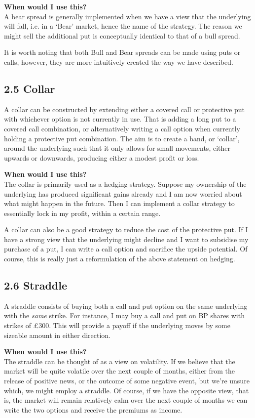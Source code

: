 \documentclass[11pt]{article}
\begin{document}
\textbf{When would I use this?} \\ 
A bear spread is generally implemented when we have a view that the underlying will fall, i.e. in a `Bear' market, hence the name of the strategy. The reason we might sell the additional put is conceptually identical to that of a bull spread. 

It is worth noting that both Bull and Bear spreads can be made using puts or calls, however, they are more intuitively created the way we have described.

\subsection*{2.5 Collar}
A collar can be constructed by extending either a covered call or protective put with whichever option is not currently in use. That is adding a long put to a covered call combination, or alternatively writing a call option when currently holding a protective put combination. The aim is to create a band, or `collar', around the underlying such that it only allows for small movements, either upwards or downwards, producing either a modest profit or loss.

\textbf{When would I use this?} \\ 
The collar is primarily used as a hedging strategy. Suppose my ownership of the underlying has produced significant gains already and I am now worried about what might happen in the future. Then I can implement a collar strategy to essentially lock in my profit, within a certain range.

A collar can also be a good strategy to reduce the cost of the protective put. If I have a strong view that the underlying might decline and I want to subsidise my purchase of a put, I can write a call option and sacrifice the upside potential. Of course, this is really just a reformulation of the above statement on hedging. 

\subsection*{2.6 Straddle}
A straddle consists of buying both a call and put option on the same underlying with the \textit{same} strike. For instance, I may buy a call and put on BP shares with strikes of £300. This will provide a payoff if the underlying moves by some sizeable amount in either direction.

\textbf{When would I use this?} \\ 
The straddle can be thought of as a view on volatility. If we believe that the market will be quite volatile over the next couple of months, either from the release of positive news, or the outcome of some negative event, but we're unsure which, we might employ a straddle. Of course, if we have the opposite view, that is, the market will remain relatively calm over the next couple of months we can write the two options and receive the premiums as income.
\end{document}
